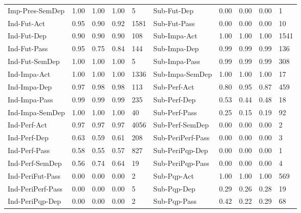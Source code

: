 \begin{table}[]
{\begin{tabular}{@{}l|llll||l|llll@{}}
 Imp-Pres-SemDep   & 1.00      & 1.00   & 1.00     & 5       & Sub-Fut-Dep       & 0.00      & 0.00   & 0.00     & 1       \\ 
 Ind-Fut-Act       & 0.95      & 0.90   & 0.92     & 1581    & Sub-Fut-Pass      & 0.00      & 0.00   & 0.00     & 10      \\ 
 Ind-Fut-Dep       & 0.90      & 0.90   & 0.90     & 108     & Sub-Impa-Act      & 1.00      & 1.00   & 1.00     & 1541    \\ 
 Ind-Fut-Pass      & 0.95      & 0.75   & 0.84     & 144     & Sub-Impa-Dep      & 0.99      & 0.99   & 0.99     & 136     \\ 
 Ind-Fut-SemDep    & 1.00      & 1.00   & 1.00     & 5       & Sub-Impa-Pass     & 0.99      & 0.99   & 0.99     & 308     \\ 
 Ind-Impa-Act      & 1.00      & 1.00   & 1.00     & 1336    & Sub-Impa-SemDep   & 1.00      & 1.00   & 1.00     & 17      \\ 
 Ind-Impa-Dep      & 0.97      & 0.98   & 0.98     & 113     & Sub-Perf-Act      & 0.80      & 0.95   & 0.87     & 459     \\ 
 Ind-Impa-Pass     & 0.99      & 0.99   & 0.99     & 235     & Sub-Perf-Dep      & 0.53      & 0.44   & 0.48     & 18      \\ 
 Ind-Impa-SemDep   & 1.00      & 1.00   & 1.00     & 40      & Sub-Perf-Pass     & 0.25      & 0.15   & 0.19     & 92      \\ 
 Ind-Perf-Act      & 0.97      & 0.97   & 0.97     & 4056    & Sub-Perf-SemDep   & 0.00      & 0.00   & 0.00     & 2       \\ 
 Ind-Perf-Dep      & 0.63      & 0.59   & 0.61     & 208     & Sub-PeriPerf-Pass & 0.00      & 0.00   & 0.00     & 3       \\ 
 Ind-Perf-Pass     & 0.58      & 0.55   & 0.57     & 827     & Sub-PeriPqp-Dep   & 0.00      & 0.00   & 0.00     & 1       \\ 
 Ind-Perf-SemDep   & 0.56      & 0.74   & 0.64     & 19      & Sub-PeriPqp-Pass  & 0.00      & 0.00   & 0.00     & 4       \\ 
 Ind-PeriFut-Pass  & 0.00      & 0.00   & 0.00     & 2       & Sub-Pqp-Act       & 1.00      & 1.00   & 1.00     & 569     \\ 
 Ind-PeriPerf-Pass & 0.00      & 0.00   & 0.00     & 5       & Sub-Pqp-Dep       & 0.29      & 0.26   & 0.28     & 19      \\ 
 Ind-PeriPqp-Dep   & 0.00      & 0.00   & 0.00     & 2       & Sub-Pqp-Pass      & 0.42      & 0.22   & 0.29     & 68      \\ 

\end{tabular}}
\end{table}
